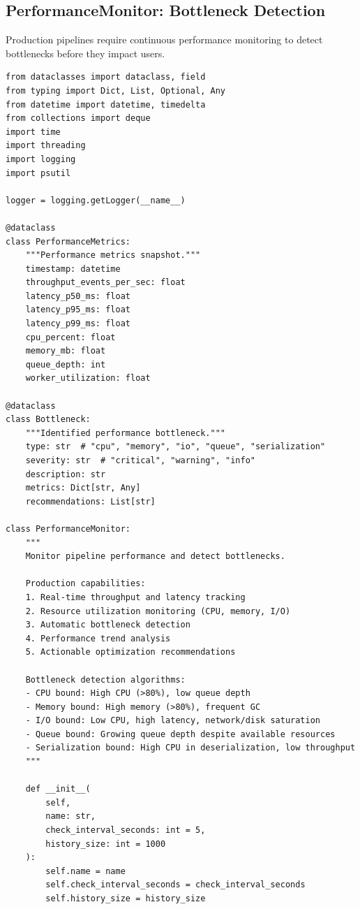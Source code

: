 \subsection{PerformanceMonitor: Bottleneck Detection}

Production pipelines require continuous performance monitoring to detect bottlenecks before they impact users.

\begin{lstlisting}[style=python, caption={Performance Monitor with Bottleneck Detection}]
from dataclasses import dataclass, field
from typing import Dict, List, Optional, Any
from datetime import datetime, timedelta
from collections import deque
import time
import threading
import logging
import psutil

logger = logging.getLogger(__name__)

@dataclass
class PerformanceMetrics:
    """Performance metrics snapshot."""
    timestamp: datetime
    throughput_events_per_sec: float
    latency_p50_ms: float
    latency_p95_ms: float
    latency_p99_ms: float
    cpu_percent: float
    memory_mb: float
    queue_depth: int
    worker_utilization: float

@dataclass
class Bottleneck:
    """Identified performance bottleneck."""
    type: str  # "cpu", "memory", "io", "queue", "serialization"
    severity: str  # "critical", "warning", "info"
    description: str
    metrics: Dict[str, Any]
    recommendations: List[str]

class PerformanceMonitor:
    """
    Monitor pipeline performance and detect bottlenecks.

    Production capabilities:
    1. Real-time throughput and latency tracking
    2. Resource utilization monitoring (CPU, memory, I/O)
    3. Automatic bottleneck detection
    4. Performance trend analysis
    5. Actionable optimization recommendations

    Bottleneck detection algorithms:
    - CPU bound: High CPU (>80%), low queue depth
    - Memory bound: High memory (>80%), frequent GC
    - I/O bound: Low CPU, high latency, network/disk saturation
    - Queue bound: Growing queue depth despite available resources
    - Serialization bound: High CPU in deserialization, low throughput
    """

    def __init__(
        self,
        name: str,
        check_interval_seconds: int = 5,
        history_size: int = 1000
    ):
        self.name = name
        self.check_interval_seconds = check_interval_seconds
        self.history_size = history_size


\end{lstlisting}
